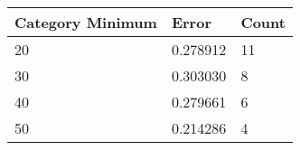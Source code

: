 \begin{tabular}{p{2cm}|p{1.8cm}|p{1.4cm}}
\toprule
 Category Minimum &    Error  &  Count \\
\midrule
               20 & 0.278912 &     11 \\
               30 & 0.303030 &      8 \\
               40 & 0.279661 &       6 \\
               50 & 0.214286  &      4 \\
\bottomrule
\end{tabular}
